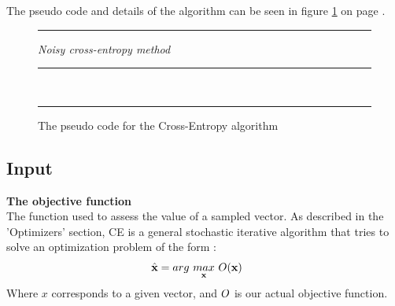 The pseudo code and details of the algorithm can be seen in figure
\ref{fig:ceCode} on page \pageref{fig:ceCode}.

\begin{figure}[H]
\hrule
\vspace{0.2cm}
{\centering  \textit{Noisy cross-entropy method}}
\vspace{0.2cm}
\hrule
\begin{algorithmic}
\\

\Loop
{}
\EndLoop
\end{algorithmic}
\hrule
\caption{The pseudo code for the Cross-Entropy algorithm \label{fig:ceCode}}
\end{figure}

\subsection{Input}

\textbf{The objective function} \\
The function used to assess the value of a sampled vector.
As described in the 'Optimizers' section, CE is a general stochastic 
iterative algorithm that tries to solve an optimization problem of 
the form \citep{thiery:09}:
\begin{align*}
\hat{\textbf{\individual }} &= 
arg \  \underset{\textbf{\individual }}{max} \  
\fitnessFunction (\textbf{\individual }) \ 
\end{align*}
Where $x$ corresponds to a given vector, 
and $O$ is our actual objective function. 
\\

